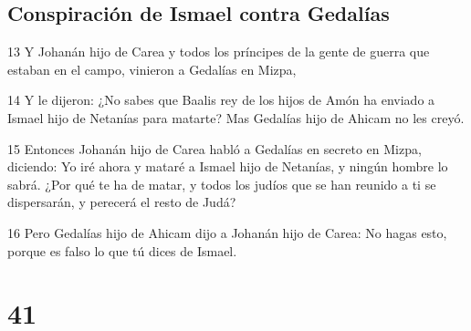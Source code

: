 \section*{Conspiración de Ismael contra Gedalías}

\par 13 Y Johanán hijo de Carea y todos los príncipes de la gente de guerra que estaban en el campo, vinieron a Gedalías en Mizpa,
\par 14 Y le dijeron: ¿No sabes que Baalis rey de los hijos de Amón ha enviado a Ismael hijo de Netanías para matarte? Mas Gedalías hijo de Ahicam no les creyó.
\par 15 Entonces Johanán hijo de Carea habló a Gedalías en secreto en Mizpa, diciendo: Yo iré ahora y mataré a Ismael hijo de Netanías, y ningún hombre lo sabrá. ¿Por qué te ha de matar, y todos los judíos que se han reunido a ti se dispersarán, y perecerá el resto de Judá?
\par 16 Pero Gedalías hijo de Ahicam dijo a Johanán hijo de Carea: No hagas esto, porque es falso lo que tú dices de Ismael.

\chapter{41}


